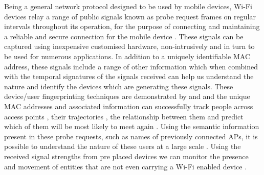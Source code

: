 Being a general network protocol designed to be used by mobile devices, Wi-Fi devices relay a range of public signals known as probe request frames on regular intervals throughout its operation, for the purpose of connecting and maintaining a reliable and secure connection for the mobile device \cite{freud2015}.
These signals can be captured using inexpensive customised hardware, non-intrusively and in turn to be used for numerous applications.
In addition to a uniquely identifiable MAC address, these signals include a range of other information which when combined with the temporal signatures of the signals received can help us understand the nature and identify the devices which are generating these signals.
These device/user fingerprinting techniques are demonstrated by \citep{franklin2006} and \citep{pang2007} and the unique MAC addresses and associated information can successfully track people across access points \cite{cunche2014a}, their trajectories \citep{musa2012}, the relationship between them \citep{cheng2012, barbera2013, cunche2014} and predict which of them will be most likely to meet again \citep{cunche2012}.
Using the semantic information present in these probe requests, such as names of previously connected APs, it is possible to understand the nature of these users at a large scale \citep{di2016}.
Using the received signal strengths from pre placed devices we can monitor the presence and movement of entities that are not even carrying a Wi-Fi enabled device \cite{elgohary2013}.

